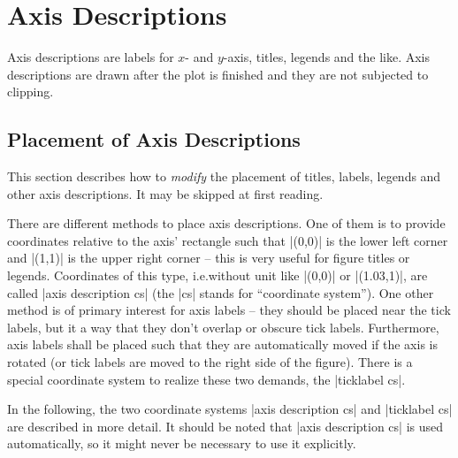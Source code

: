 
\section[reference.axisdescription]{Axis Descriptions}

Axis descriptions are labels for $x$- and $y$-axis, titles, legends and the
like. Axis descriptions are drawn after the plot is finished and they are not
subjected to clipping.


\subsection{Placement of Axis Descriptions}

This section describes how to \emph{modify} the placement of titles, labels,
legends and other axis descriptions. It may be skipped at first reading.

There are different methods to place axis descriptions. One of them is to
provide coordinates relative to the axis' rectangle such that |(0,0)| is the
lower left corner and |(1,1)| is the upper right corner -- this is very useful
for figure titles or legends. Coordinates of this type, i.e.\@ without unit
like |(0,0)| or |(1.03,1)|, are called |axis description cs| (the |cs| stands
for ``coordinate system''). One other method is of primary interest for axis
labels -- they should be placed near the tick labels, but it a way that they
don't overlap or obscure tick labels. Furthermore, axis labels shall be placed
such that they are automatically moved if the axis is rotated (or tick labels
are moved to the right side of the figure). There is a special coordinate
system to realize these two demands, the |ticklabel cs|.

In the following, the two coordinate systems |axis description cs| and
|ticklabel cs| are described in more detail. It should be noted that
|axis description cs| is used automatically, so it might never be necessary to
use it explicitly.


